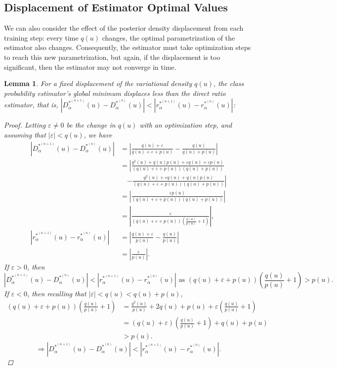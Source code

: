 \documentclass[honours,12pt, twoside]{unswthesis}
\def\implies{\Rightarrow}
\newtheorem{lemma}[theorem]{Lemma}
\numberwithin{equation}{section}
\theoremstyle{definition}
\begin{document}
\subsection{Displacement of Estimator Optimal Values}
We can also consider the effect of the posterior density displacement from each training step: every time $q(u)$ changes, the optimal parametrization of the estimator also changes. Consequently, the estimator must take optimization steps to reach this new parametrization, but again, if the displacement is too significant, then the estimator may not converge in time.
\begin{lemma}
For a fixed displacement of the variational density $q(u)$, the class probability estimator's global minimum displaces less than the direct ratio estimator, that is, $|D^{*^{(n+1)}}_\alpha(u)-D^{*^{(n)}}_\alpha(u)|<|r^{*^{(n+1)}}_\alpha(u)-r^{*^{(n)}}_\alpha(u)|$:
\begin{proof}
Letting $\varepsilon\neq0$ be the change in $q(u)$ with an optimization step, and assuming that $|\varepsilon|<q(u)$, we have
\begin{align*}
|D^{*^{(n+1)}}_\alpha(u)-D^{*^{(n)}}_\alpha(u)|&=\left|\frac{q(u)+\varepsilon}{q(u)+\varepsilon+p(u)}-\frac{q(u)}{q(u)+p(u)}\right|\\
&=\left|\frac{q^2(u)+q(u)p(u)+\varepsilon q(u)+\varepsilon p(u)}{(q(u)+\varepsilon+p(u))(q(u)+p(u))}\right.\\
&\quad \left.-\frac{q^2(u)+\varepsilon q(u)+q(u)p(u)}{(q(u)+\varepsilon+p(u))(q(u)+p(u))}\right|\\
&=\left|\frac{\varepsilon p(u)}{(q(u)+\varepsilon+p(u))(q(u)+p(u))}\right|\\
&=\left|\frac{\varepsilon}{(q(u)+\varepsilon+p(u))\left(\frac{q(u)}{p(u)}+1\right)}\right|,\\
|r^{*^{(n+1)}}_\alpha(u)-r^{*^{(n)}}_\alpha(u)|&=\left|\frac{q(u)+\varepsilon}{p(u)}-\frac{q(u)}{p(u)}\right|\\
&=\left|\frac{\varepsilon}{p(u)}\right|.
\end{align*}
If $\varepsilon>0$, then
\[|D^{*^{(n+1)}}_\alpha(u)-D^{*^{(n)}}_\alpha(u)|<|r^{*^{(n+1)}}_\alpha(u)-r^{*^{(n)}}_\alpha(u)|\text{ as }(q(u)+\varepsilon+p(u))\left(\frac{q(u)}{p(u)}+1\right)>p(u).\]
If $\varepsilon<0$, then recalling that $|\varepsilon| < q(u) < q(u)+p(u)$,
\begin{align*}
(q(u)+\varepsilon+p(u))(\frac{q(u)}{p(u)}+1)&=\frac{q^2(u)}{p(u)}+2q(u)+p(u)+\varepsilon \left(\frac{q(u)}{p(u)}+1\right)\\
&=(q(u)+\varepsilon)\left(\frac{q(u)}{p(u)}+1\right)+q(u)+p(u)\\
&>p(u).
\end{align*}
\[\implies |D^{*^{(n+1)}}_\alpha(u)-D^{*^{(n)}}_\alpha(u)|<|r^{*^{(n+1)}}_\alpha(u)-r^{*^{(n)}}_\alpha(u)|.\]
\end{proof}
\end{lemma}
\end{document}
